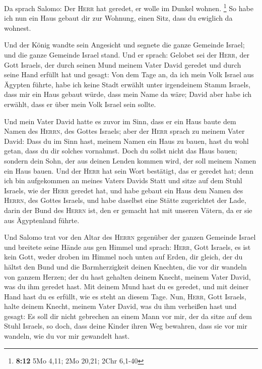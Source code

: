  Da sprach Salomo: Der \textsc{Herr} hat geredet, er
wolle im Dunkel wohnen. \footnote{\textbf{8:12} 5Mo 4,11; 2Mo 20,21;
  2Chr 6,1-40}  So habe ich nun ein Haus gebaut dir zur
Wohnung, einen Sitz, dass du ewiglich da wohnest.

 Und der König wandte sein Angesicht und segnete die
ganze Gemeinde Israel; und die ganze Gemeinde Israel stand.
 Und er sprach: Gelobet sei der \textsc{Herr}, der Gott
Israels, der durch seinen Mund meinem Vater David geredet und durch
seine Hand erfüllt hat und gesagt:  Von dem Tage an, da
ich mein Volk Israel aus Ägypten führte, habe ich keine Stadt erwählt
unter irgendeinem Stamm Israels, dass mir ein Haus gebaut würde, dass
mein Name da wäre; David aber habe ich erwählt, dass er über mein Volk
Israel sein sollte.

 Und mein Vater David hatte es zuvor im Sinn, dass er ein
Haus baute dem Namen des \textsc{Herrn}, des Gottes Israels;
 aber der \textsc{Herr} sprach zu meinem Vater David:
Dass du im Sinn hast, meinem Namen ein Haus zu bauen, hast du wohl
getan, dass du dir solches vornahmst.  Doch du sollst
nicht das Haus bauen; sondern dein Sohn, der aus deinen Lenden kommen
wird, der soll meinem Namen ein Haus bauen.  Und der
\textsc{Herr} hat sein Wort bestätigt, das er geredet hat; denn ich bin
aufgekommen an meines Vaters Davids Statt und sitze auf dem Stuhl
Israels, wie der \textsc{Herr} geredet hat, und habe gebaut ein Haus dem
Namen des \textsc{Herrn}, des Gottes Israels,  und habe
daselbst eine Stätte zugerichtet der Lade, darin der Bund des
\textsc{Herrn} ist, den er gemacht hat mit unseren Vätern, da er sie aus
Ägyptenland führte.

 Und Salomo trat vor den Altar des \textsc{Herrn}
gegenüber der ganzen Gemeinde Israel und breitete seine Hände aus gen
Himmel  und sprach: \textsc{Herr}, Gott Israels, es ist
kein Gott, weder droben im Himmel noch unten auf Erden, dir gleich, der
du hältst den Bund und die Barmherzigkeit deinen Knechten, die vor dir
wandeln von ganzem Herzen;  der du hast gehalten deinem
Knecht, meinem Vater David, was du ihm geredet hast. Mit deinem Mund
hast du es geredet, und mit deiner Hand hast du es erfüllt, wie es steht
an diesem Tage.  Nun, \textsc{Herr}, Gott Israels, halte
deinem Knecht, meinem Vater David, was du ihm verheißen hast und gesagt:
Es soll dir nicht gebrechen an einem Mann vor mir, der da sitze auf dem
Stuhl Israels, so doch, dass deine Kinder ihren Weg bewahren, dass sie
vor mir wandeln, wie du vor mir gewandelt hast.

